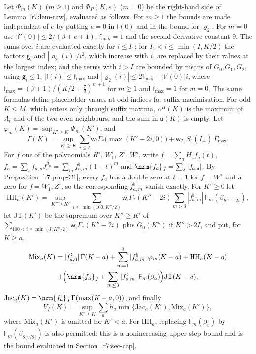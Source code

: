 Let $\Phi_m(K)$ ($m\geq1$) and $\Phi_P(K,e)$ ($m=0$) be the right-hand side of Lemma~\ref{r7:lem-raw}, evaluated as follows. For $m\geq1$ the bounds are made independent of $e$ by putting $e=0$ in $\mathsf f(0)$ and in the bound for $\varrho_2$. For $m=0$ use $|\mathsf f'(0)|\leq2/(\beta+e+1)$, $\mathsf f_{\max}=1$ and the second-derivative constant $9$. The sums over $i$ are evaluated exactly for $i\leq I_1$; for  $I_1<i\leq\min(I,K/2)$ the factors $\mathsf g_i$ and $|\varrho_2(i)|/i^2$, which increase with $i$, are replaced by their values at the largest index; and the terms with $i>I$ are bounded by means of $G_0,G_1,G_2$, using $\mathsf g_i\leq1$, $|\mathsf f(i)|\leq\mathsf f_{\max}$ and $|\varrho_2(i)|\leq2\mathsf f_{\max}+|\mathsf f'(0)|i$, where $\mathsf f_{\max}=(\beta+1)/(K/2+\frac72)^{m+1}$ for $m\geq1$ and $\mathsf f_{\max}=1$ for $m=0$. The same formulas define placeholder values at odd indices for suffix maximisation. For odd $K\leq M$, which enters only through suffix maxima, $\alpha^H(K)$ is the maximum of $A_t$ and of the two even neighbours, and the sum in $\mathsf u(K)$ is empty. Let $\varphi_m(K)=\sup_{K'\geq K}\Phi_m(K')$, and
\[
\bar\Gamma(K)=\sup_{K'\geq K}\sum_{i\leq I}\mathsf w_i\Gamma_*\big(\max(K'-2i,0)\big)+\mathsf w_{I_+}S_0(I_+)\,\Gamma_{\max} .
\]
For $f$ one of the polynomials $H^\circ$, $W^\circ_1$, $Z^\circ$, $W^\circ$, write $f=\sum_aH_af_a(t)$, $f_a=\sum_sf_{a,s}J^{\beta_a}_s=\sum_mf^\natural_{a,m}(1-t)^m$ and $\nrm{f_a}_J=\sum_s|f_{a,s}|$. By Proposition~\ref{r7:prop-C1}, every $f_a$ has a double zero at $t=1$ for $f=W^\circ$ and a zero for $f=W^\circ_1,Z^\circ$, so the corresponding $f^\natural_{a,m}$ vanish exactly. For $K'\geq0$ let
\[
\mathrm{HH}_a(K')=\sup_{K''\geq K'}\sum_{i\leq\min(100,K''/2)}\mathsf w_i\Gamma_*(K''-2i)\sum_{m>3}|f^\natural_{a,m}|\,\mathsf F_m(\beta_{K''-2i}),
\]
let $\mathrm{JT}(K')$ be the supremum over $K''\geq K'$ of $\sum_{100<i\leq\min(I,K''/2)}\mathsf w_i\Gamma_*(K''-2i)$ plus $G_0(K'')$ if $K''>2I$, and put, for $K\geq a$,
\begin{multline*}
\mathrm{Mix}_a(K)=|f^\natural_{a,0}|\,\bar\Gamma(K-a)+\sum_{m=1}^3|f^\natural_{a,m}|\,\varphi_m(K-a)+\mathrm{HH}_a(K-a)\\
+\Big(\nrm{f_a}_J+\sum_{m\leq3}|f^\natural_{a,m}|\,\mathsf F_m(\beta_a)\Big)\mathrm{JT}(K-a),
\end{multline*}
$\mathrm{Jac}_a(K)=\nrm{f_a}_J\,\bar\Gamma(\max(K-a,0))$, and finally
\[
V_f(K)=\sup_{K'\geq K}\sum_ah_a\min\{\mathrm{Jac}_a(K'),\mathrm{Mix}_a(K')\},
\]
where $\mathrm{Mix}_a(K')$ is omitted for $K'<a$. For $\mathrm{HH}_a$, replacing $\mathsf F_m(\beta_v)$ by $\mathsf F_m(\beta_{8\lfloor v/8\rfloor})$ is also permitted: this is a nonincreasing upper step bound and is the bound evaluated in Section~\ref{r7:sec-cap}.

